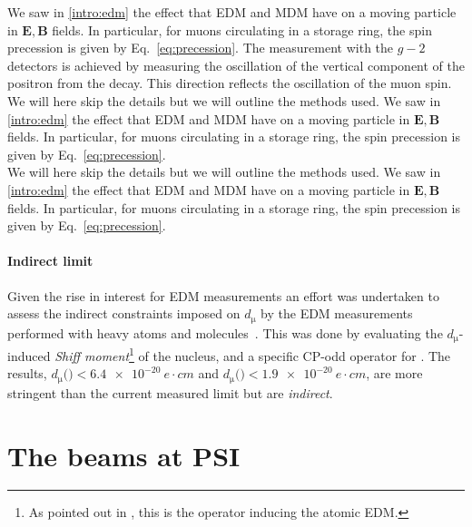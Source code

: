 \begin{refsection}
            \begin{outline}
                \1[BNL] We saw in \ref{intro:edm} the effect that EDM and MDM have on a moving particle in $\bm{E},\bm{B}$ fields.
                In particular, for muons circulating in a storage ring, the spin precession is given by Eq.~\ref{eq:precession}. 
                The measurement with the $g-2$ detectors is achieved by measuring the oscillation of the vertical component of the positron from the decay. This direction reflects the oscillation of the muon spin.\\
                \1[$g-2$] We will here skip the details but we will outline the methods used. We saw in \ref{intro:edm} the effect that EDM and MDM have on a moving particle in $\bm{E},\bm{B}$ fields. In particular, for muons circulating in a storage ring, the spin precession is given by Eq.~\ref{eq:precession}.\\
                \1[FSD]  We will here skip the details but we will outline the methods used. We saw in \ref{intro:edm} the effect that EDM and MDM have on a moving particle in $\bm{E},\bm{B}$ fields. In particular, for muons circulating in a storage ring, the spin precession is given by Eq.~\ref{eq:precession}.
            \end{outline}
              
            \paragraph{Indirect limit} Given the rise in interest for EDM measurements an effort was undertaken to assess the indirect constraints imposed on $d_\upmu$ by the EDM measurements performed with heavy atoms and molecules~\cite{muEDM:indirect}. 
            This was done by evaluating the $d_\upmu$- induced \textit{Shiff moment}\footnote{As pointed out in \cite{Shiff}, this is the operator inducing the atomic EDM.} of the  nucleus, and a specific CP-odd operator for .            
            The results, $d_\upmu($$)<\SI{6.4e-20}{e\cdot cm}$ and $d_\upmu($$)<\SI{1.9e-20}{e\cdot cm}$, are more stringent than the current measured limit but are \textit{indirect}.
      
\section{The beams at PSI}
    \label{intro:beamlines}
    

\end{refsection}
